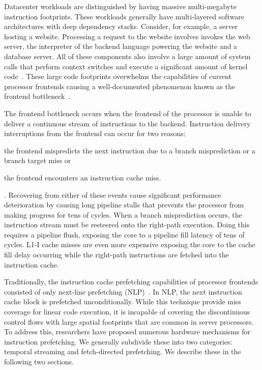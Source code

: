 \documentclass[../main.tex]{subfiles}
\begin{document}
\begin{refsection}
Datacenter workloads are distinguished by having massive
multi-megabyte instruction footprints. These workloads generally have
multi-layered software architectures with deep dependency
stacks. Consider, for example, a server hosting a website. Processing
a request to the website involves invokes the web server, the
interpreter of the backend language powering the website and a
database server. All of these components also involve a large amount
of system calls that perform context switches and execute a
significant amount of kernel
code~\cite{ferdman12_clear_cloud,ailamaki99_dbmss_moder_proces}. These
large code footprints overwhelms the capabilities of current processor
frontends causing a well-documented phenomenon known as the frontend
bottleneck~\cite{kanev15_profil,ferdman12_clear_cloud,ayers19_asmdb,kanev15_profil,kumar17_boomer,kumar18_blast_throug_front_end_bottl_with_shotg,kumar20_shoot_down_server_front_end_bottl,spracklen05_effec_instr_prefet_chip_multip}.


The frontend bottleneck occurs when the frontend of the processor is
unable to deliver a continuous stream of instructions to the backend.
Instruction delivery interruptions from the frontend can occur for two
reasons: \begin{inparaenum}[1)] \item the frontend mispredicts the
  next instruction due to a branch misprediction or a branch target
  miss or \item the frontend encounters an instruction cache
  miss.\end{inparaenum}. Recovering from either of these events cause
significant performance deterioration by causing long pipeline stalls
that prevents the processor from making progress for tens of
cycles. When a branch misprediction occurs, the instruction stream
must be resteered onto the right-path execution. Doing this requires a
pipeline flush, exposing the core to a pipeline fill latency of tens
of cycles. L1-I cache misses are even more expensive exposing the core
to the cache fill delay occurring while the right-path instructions are
fetched into the instruction cache.

Traditionally, the instruction cache prefetching capabilities of
processor frontends consisted of only next-line prefetching
(NLP)~\cite{nextline_pref}. In NLP, the next instruction cache block
is prefetched unconditionally. While this technique provide miss
coverage for linear code execution, it is incapable of covering the
discontinuous control flows with large spatial footprints that are
common in server processors. To address this, researchers have
proposed numerous hardware mechanisms for instruction prefetching. We
generally subdivide these into two categories: temporal streaming and
fetch-directed prefetching. We describe these in the following two
sections.


\end{refsection}
\end{document}
